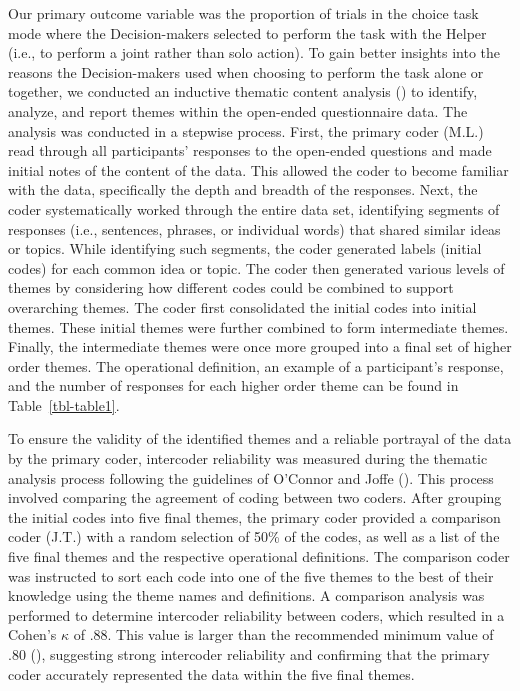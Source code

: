 \documentclass[
  man,
  floatsintext,
  longtable,
  nolmodern,
  notxfonts,
  notimes,
  colorlinks=true,linkcolor=blue,citecolor=blue,urlcolor=blue]{apa7}
\begin{document}
Our primary outcome variable was the proportion of trials in the choice
task mode where the Decision-makers selected to perform the task with
the Helper (i.e., to perform a joint rather than solo action). To gain
better insights into the reasons the Decision-makers used when choosing
to perform the task alone or together, we conducted an inductive
thematic content analysis () to identify, analyze, and report themes within the open-ended
questionnaire data. The analysis was conducted in a stepwise process.
First, the primary coder (M.L.) read through all participants' responses
to the open-ended questions and made initial notes of the content of the
data. This allowed the coder to become familiar with the data,
specifically the depth and breadth of the responses. Next, the coder
systematically worked through the entire data set, identifying segments
of responses (i.e., sentences, phrases, or individual words) that shared
similar ideas or topics. While identifying such segments, the coder
generated labels (initial codes) for each common idea or topic. The
coder then generated various levels of themes by considering how
different codes could be combined to support overarching themes. The
coder first consolidated the initial codes into initial themes. These
initial themes were further combined to form intermediate themes.
Finally, the intermediate themes were once more grouped into a final set
of higher order themes. The operational definition, an example of a
participant's response, and the number of responses for each higher
order theme can be found in Table~\ref{tbl-table1}.

To ensure the validity of the identified themes and a reliable portrayal
of the data by the primary coder, intercoder reliability was measured
during the thematic analysis process following the guidelines of
O'Connor and Joffe (). This process
involved comparing the agreement of coding between two coders. After
grouping the initial codes into five final themes, the primary coder
provided a comparison coder (J.T.) with a random selection of 50\% of
the codes, as well as a list of the five final themes and the respective
operational definitions. The comparison coder was instructed to sort
each code into one of the five themes to the best of their knowledge
using the theme names and definitions. A comparison analysis was
performed to determine intercoder reliability between coders, which
resulted in a Cohen's \(\kappa\) of .88. This value is larger than the
recommended minimum value of .80 (), suggesting strong intercoder reliability and confirming
that the primary coder accurately represented the data within the five
final themes.
\end{document}
